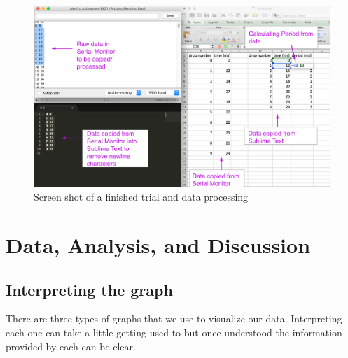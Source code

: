 \documentclass[11pt]{article}
\begin{document}
\newpage
\begin{figure}[htp]
\begin{center}
\includegraphics[width=7in]{figs/screen2}
\caption{ Screen shot of a finished trial and data processing}
\label{screen}
\end{center}
\end{figure}

\newpage

\section{Data, Analysis, and Discussion}
\subsection{Interpreting the graph}
There are three types of graphs that we use to visualize our data. Interpreting each one can take a little getting used to but once understood the information provided by each can be clear. 
\end{document}

